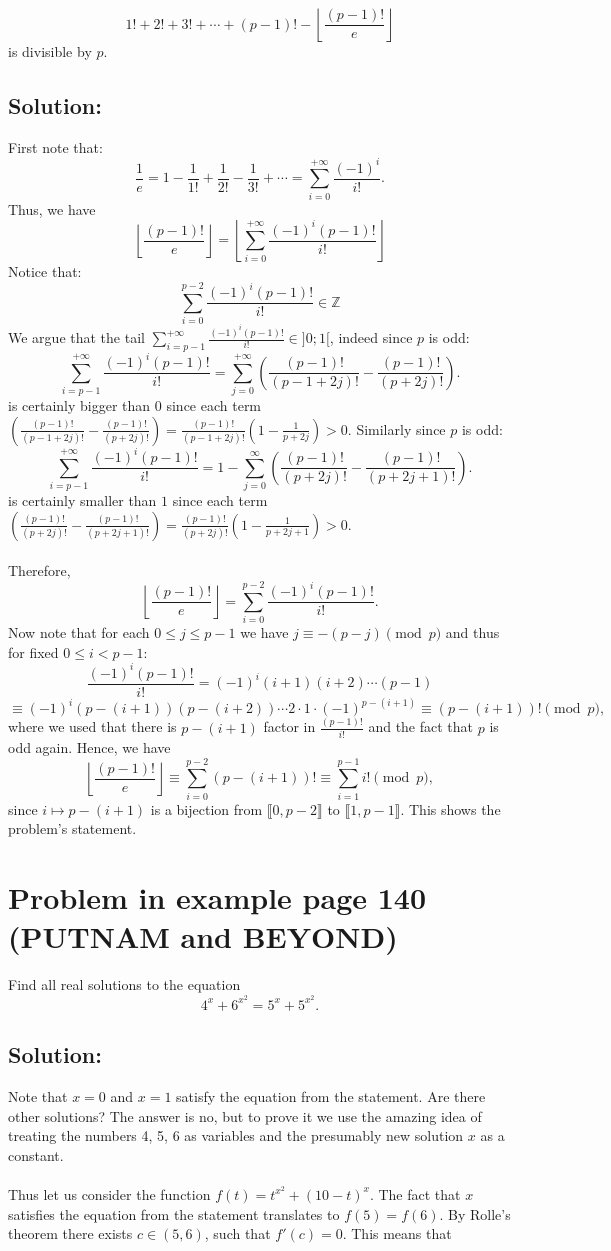 \documentclass[11pt, a4paper, oneside]{article}
\newcommand{\problem}[1][]{\section{#1} \hfill \par}
\newcommand{\solution}[1][]{\subsection*{#1}\hfill \par}
\theoremstyle{remark}
\theoremstyle{lemma}
\begin{document}
\[
1! + 2! + 3! + \cdots + (p-1)! - \left\lfloor \frac{(p-1)!}{e} \right\rfloor
\]
is divisible by \( p \).
\solution[Solution:]
First note that:
\[
\frac{1}{e} = 1 - \frac{1}{1!} + \frac{1}{2!} - \frac{1}{3!} + \cdots = \sum_{i=0}^{+\infty} \frac{(-1)^i}{i!}.
\]
Thus, we have
\[
\left\lfloor \frac{(p-1)!}{e} \right\rfloor = \left\lfloor \sum_{i=0}^{+\infty} \frac{(-1)^i (p-1)!}{i!} \right\rfloor
\]
Notice that:
$$\sum_{i=0}^{p-2} \frac{(-1)^i (p-1)!}{i!}\in\mathbb{Z}$$
We argue that the tail $\sum_{i=p-1}^{+\infty} \frac{(-1)^i (p-1)!}{i!}\in]0;1[$, indeed since $p$ is odd:
\[
\sum_{i=p-1}^{+\infty} \frac{(-1)^i (p-1)!}{i!}= \sum_{j=0}^{+\infty} \left(\frac{(p-1)!}{(p-1+2j)!}-\frac{(p-1)!}{(p+2j)!}\right).
\]
is certainly bigger than $0$ since each term $\left(\frac{(p-1)!}{(p-1+2j)!}-\frac{(p-1)!}{(p+2j)!}\right)=\frac{(p-1)!}{(p-1+2j)!}\left(1-\frac{1}{p+2j}\right)>0$. Similarly since $p$ is odd:
\[
\sum_{i=p-1}^{+\infty} \frac{(-1)^i (p-1)!}{i!}=1-\sum_{j=0}^\infty \left(\frac{(p-1)!}{(p+2j)!}-\frac{(p-1)!}{(p+2j+1)!}\right).
\]
is certainly smaller than $1$ since each term $\left(\frac{(p-1)!}{(p+2j)!}-\frac{(p-1)!}{(p+2j+1)!}\right)=\frac{(p-1)!}{(p+2j)!}(1-\frac{1}{p+2j+1})>0$.
\\\\
Therefore,
\[
\left\lfloor \frac{(p-1)!}{e} \right\rfloor = \sum_{i=0}^{p-2} \frac{(-1)^i (p-1)!}{i!}.
\]
Now note that for each $0\leq j\leq p-1$ we have $j\equiv -(p-j)\pmod{p}$ and thus for fixed $0\leq i < p-1$:
\[
\frac{(-1)^i (p-1)!}{i!} = (-1)^i (i+1)(i+2)\cdots(p-1) \]
\[
\equiv (-1)^i (p-(i+1))(p-(i+2))\cdots 2 \cdot 1 \cdot (-1)^{p-(i+1)} \equiv (p-(i+1))! \pmod{p},
\]
where we used that there is $p-(i+1)$ factor in $\frac{(p-1)!}{i!}$ and the fact that \( p \) is odd again. Hence, we have
\[
\left\lfloor \frac{(p-1)!}{e} \right\rfloor \equiv \sum_{i=0}^{p-2} (p-(i+1))! \equiv \sum_{i=1}^{p-1} i! \pmod{p},
\]
since $i\mapsto p-(i+1)$ is a bijection from $\llbracket 0,p-2\rrbracket$ to $\llbracket 1,p-1\rrbracket$.
This shows the problem’s statement.
\problem[Problem in example page 140 (PUTNAM and BEYOND)]
Find all real solutions to the equation
\[
4^{x} + 6^{x^{2}} = 5^{x} + 5^{x^{2}}.
\]
\solution[Solution:]
Note that \(x = 0\) and \(x = 1\) satisfy the equation from the statement. Are there other solutions? The answer is no, but to prove it we use the amazing idea of treating the numbers 4, 5, 6 as variables and the presumably new solution \(x\) as a constant.
\\\\
Thus let us consider the function \(f(t) = t^{x^{2}} + (10 - t)^{x}\). The fact that \(x\) satisfies the equation from the statement translates to \(f(5) = f(6)\). By Rolle's theorem there exists \(c \in (5, 6)\), such that \(f'(c) = 0\). This means that
\end{document}
